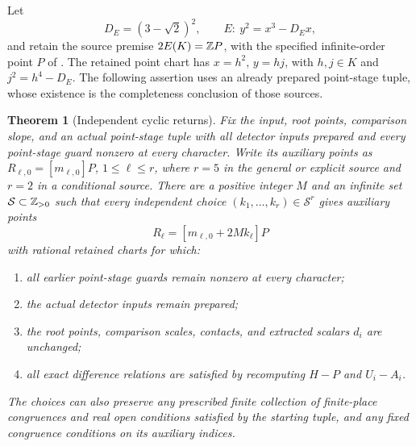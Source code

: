 \documentclass[11pt,a4paper]{article}
\newtheorem{theorem}{Theorem}[section]
\theoremstyle{remark}\newtheorem{remark}[theorem]{Remark}
\begin{document}
Let
\[
 D_E=(3-\sqrt2)^2,\qquad E:\ y^2=x^3-D_E x,
\]
and retain the source premise $2E(K)=\mathbb Z P$, with the specified
infinite-order point $P$ of \cite{General,UnitNorm}. The retained point
chart has $x=h^2$, $y=hj$, with $h,j\in K$ and $j^2=h^4-D_E$.
The following assertion uses an already prepared point-stage tuple,
whose existence is the completeness conclusion of those sources.

\begin{samepage}
\begin{theorem}[Independent cyclic returns]\label{thm:indices}
Fix the input, root points, comparison slope, and an actual point-stage
tuple with all detector inputs prepared and every point-stage guard
nonzero at every character. Write its auxiliary points as
$R_{\ell,0}=[m_{\ell,0}]P$, $1\le\ell\le r$, where $r=5$ in
the general or explicit source and $r=2$ in a conditional source.
There are a positive integer $M$ and an infinite set
$\mathcal S\subset\mathbb Z_{>0}$ such that every independent choice
$(k_1,\ldots,k_r)\in\mathcal S^r$ gives auxiliary points
\begin{equation}\label{eq:independent}
             R_\ell=[m_{\ell,0}+2Mk_\ell]P
\end{equation}
with rational retained charts for which:
\begin{enumerate}
\item all earlier point-stage guards remain nonzero at every character;
\item the actual detector inputs remain prepared;
\item the root points, comparison scales, contacts, and extracted
      scalars $d_i$ are unchanged;
\item all exact difference relations are satisfied by recomputing
      $H-P$ and $U_i-A_i$.
\end{enumerate}
The choices can also preserve any prescribed finite collection of
finite-place congruences and real open conditions satisfied by the
starting tuple, and any fixed congruence conditions on its auxiliary
indices.
\end{theorem}
\end{samepage}
\end{document}
